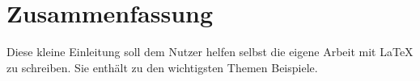 \chapter*{Zusammenfassung}

Diese kleine Einleitung soll dem Nutzer helfen selbst die eigene Arbeit mit \LaTeX{} zu schreiben. Sie enthält zu den wichtigsten Themen Beispiele.


\cite{badshah2019deep}
\cite{cnn}
\cite{elearning}
\cite{spectrogram}